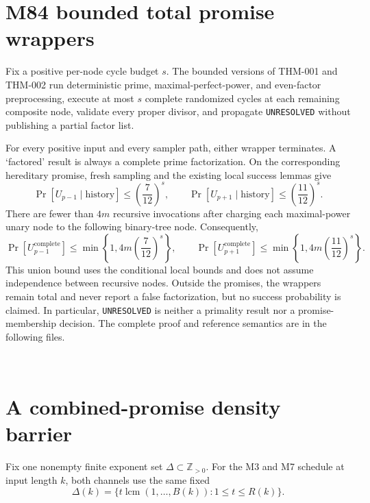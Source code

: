 \documentclass[11pt]{article}
\begin{document}
\section{M84 bounded total promise wrappers}

Fix a positive per-node cycle budget \(s\). The bounded versions of THM-001
and THM-002 run deterministic prime, maximal-perfect-power, and even-factor
preprocessing, execute at most \(s\) complete randomized cycles at each
remaining composite node, validate every proper divisor, and propagate
\texttt{UNRESOLVED} without publishing a partial factor list.

For every positive input and every sampler path, either wrapper terminates.
A `factored' result is always a complete prime factorization. On the
corresponding hereditary promise, fresh sampling and the existing local
success lemmas give
\[
\Pr[U_{p-1}\mid\text{history}]
\le\left(\frac7{12}\right)^s,\qquad
\Pr[U_{p+1}\mid\text{history}]
\le\left(\frac{11}{12}\right)^s.
\]
There are fewer than \(4m\) recursive invocations after charging each
maximal-power unary node to the following binary-tree node. Consequently,
\[
\Pr[U^{\mathrm{complete}}_{p-1}]
\le\min\left\{1,4m\left(\frac7{12}\right)^s\right\},
\qquad
\Pr[U^{\mathrm{complete}}_{p+1}]
\le\min\left\{1,4m\left(\frac{11}{12}\right)^s\right\}.
\]
This union bound uses the conditional local bounds and does not assume
independence between recursive nodes. Outside the promises, the wrappers
remain total and never report a false factorization, but no success
probability is claimed. In particular, \texttt{UNRESOLVED} is neither a
primality result nor a promise-membership decision. The complete proof and
reference semantics are in the following files.
\par\smallskip
\noindent\begin{minipage}{\linewidth}
\raggedright\small
{}\\
\end{minipage}

\section{A combined-promise density barrier}

Fix one nonempty finite exponent set
\(\Delta\subset\mathbb Z_{>0}\). For the M3 and M7 schedule at input length
\(k\), both channels use the same fixed
\[
\Delta(k)=
\{t\operatorname{lcm}(1,\ldots,B(k)):1\le t\le R(k)\}.
\]
\end{document}
